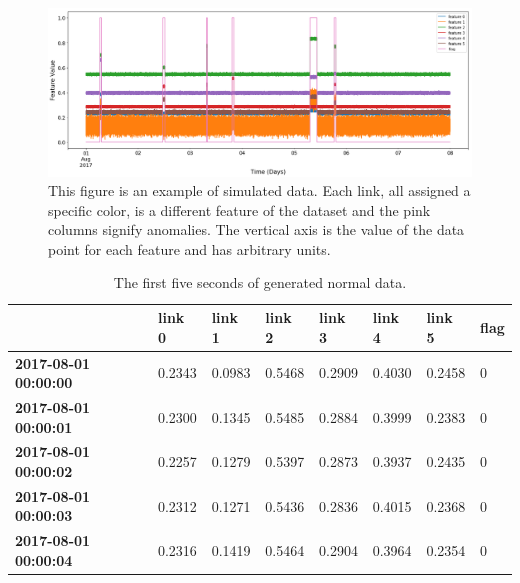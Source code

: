 \documentclass[5p]{elsarticle}
\begin{document}
\begin{figure}[htbp]
    \centering
    \includegraphics[width=1.0\textwidth]{untouched.png}
    \caption{This figure is an example of simulated data. Each link, all assigned a specific color, is a different feature of the dataset and the pink columns signify anomalies. The vertical axis is the value of the data point for each feature and has arbitrary units.}
    \label{fig:untouched}
\end{figure}

\iffalse

\begin{table}[htbp]
\centering
\caption{The first five seconds of generated normal data.}
\label{table:first5s}
\resizebox{\linewidth}{!} {%
\begin{tabular}{@{}llllllll@{}}
\toprule
                             & \textbf{link 0} & \textbf{link 1} & \textbf{link 2} & \textbf{link 3} & \textbf{link 4} & \textbf{link 5} & \textbf{flag} \\ \midrule
\textbf{2017-08-01 00:00:00} & 0.2343          & 0.0983          & 0.5468          & 0.2909          & 0.4030          & 0.2458          & 0             \\
\textbf{2017-08-01 00:00:01} & 0.2300          & 0.1345          & 0.5485          & 0.2884          & 0.3999          & 0.2383          & 0             \\
\textbf{2017-08-01 00:00:02} & 0.2257          & 0.1279          & 0.5397          & 0.2873          & 0.3937          & 0.2435          & 0             \\
\textbf{2017-08-01 00:00:03} & 0.2312          & 0.1271          & 0.5436          & 0.2836          & 0.4015          & 0.2368          & 0             \\
\textbf{2017-08-01 00:00:04} & 0.2316          & 0.1419          & 0.5464          & 0.2904          & 0.3964          & 0.2354          & 0             \\ \bottomrule
\end{tabular}%
}
\end{table}
\end{document}
